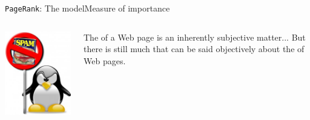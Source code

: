\documentclass[xcolor=table,final]{beamer} %
\newcommand{\PageRank}{\texttt{PageRank}\xspace}
\begin{document}
\begin{frame}{\PageRank : The model}{Measure of importance}
  \begin{columns}
    \begin{column}{0.3\textwidth}
      \includegraphics[width=1.\textwidth]{figs/extras/penguin-no-spam}%
    \end{column}
    \begin{column}{0.7\textwidth}


      \begin{exampleblock}{}%

        The  of a Web page is an inherently subjective matter...%
        But there is still much that can be said \alert{objectively} about the  of Web pages.


\end{exampleblock}
\end{column}
\end{columns}
\end{frame}
\end{document}
